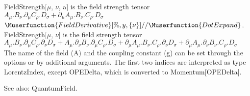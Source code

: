 



FieldStrength[\(\mu \), \(\nu \), a] is the field strength tensor \({A_{\mu }}.{B_{\nu }}.{{\partial }_{\mu }}C_{\rho }^{ }.{D_{\sigma }}+
   {{\partial }_{\mu }}A_{\mu }^{ }.{B_{\nu }}.{C_{\rho }}.{D_{\sigma }}\)\(\Muserfunction{FieldDerivative}[\%,y,\{\nu \}]//\Muserfunction{DotExpand}\).
FieldStrength[\(\mu \), \(\nu \)] is the field strength tensor \({A_{\mu }}.{B_{\nu }}.{{\partial }_{\mu }}C_{\rho }^{ }.{{\partial }_{\nu }}D_{\sigma
}^{ }+
   {A_{\mu }}.{{\partial }_{\nu }}B_{\nu }^{ }.{{\partial }_{\mu }}C_{\rho }^{ }.{D_{\sigma }}+
   {{\partial }_{\mu }}A_{\mu }^{ }.{B_{\nu }}.{C_{\rho }}.{{\partial }_{\nu }}D_{\sigma }^{ }+
   {{\partial }_{\mu }}A_{\mu }^{ }.{{\partial }_{\nu }}B_{\nu }^{ }.{C_{\rho }}.{D_{\sigma }}\) The name of the field (A) and the coupling
constant (g) can be set through the options or by additional arguments. The first two indices
  are interpreted as type LorentzIndex, except OPEDelta, which is converted to Momentum[OPEDelta].



See also:  QuantumField.






